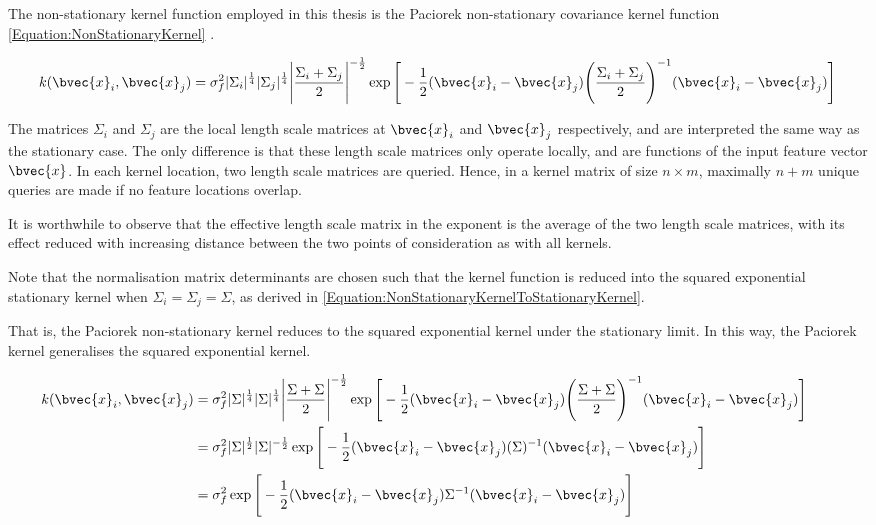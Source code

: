 				The non-stationary kernel function employed in this thesis is the Paciorek non-stationary covariance kernel function \eqref{Equation:NonStationaryKernel} \citep{AdaptiveNonStationaryKernel}.
				
				\begin{equation}
					k(\bvec{x}_{i}, \bvec{x}_{j}) = \sigma_{f}^{2} |\Sigma_{i}|^{\frac{1}{4}} |\Sigma_{j}|^{\frac{1}{4}} \Bigg|\frac{\Sigma_{i} + \Sigma_{j}}{2}\Bigg|^{-\frac{1}{2}} \exp\Bigg[ -\frac{1}{2} (\bvec{x}_{i} - \bvec{x}_{j}) \Bigg(\frac{\Sigma_{i} + \Sigma_{j}}{2}\Bigg)^{-1} (\bvec{x}_{i} - \bvec{x}_{j}) \Bigg]
				\label{Equation:NonStationaryKernel}
				\end{equation}			
				
				The matrices $\Sigma_{i}$ and $\Sigma_{j}$ are the local length scale matrices at $\bvec{x}_{i}$ and $\bvec{x}_{j}$ respectively, and are interpreted the same way as the stationary case. The only difference is that these length scale matrices only operate locally, and are functions of the input feature vector $\bvec{x}$. In each kernel location, two length scale matrices are queried. Hence, in a kernel matrix of size $n \times m$, maximally $n + m$ unique queries are made if no feature locations overlap.
				
				It is worthwhile to observe that the effective length scale matrix in the exponent is the average of the two length scale matrices, with its effect reduced with increasing distance between the two points of consideration as with all kernels.
				
				Note that the normalisation matrix determinants are chosen such that the kernel function is reduced into the squared exponential stationary kernel when $\Sigma_{i} = \Sigma_{j} = \Sigma$, as derived in \eqref{Equation:NonStationaryKernelToStationaryKernel}. 
		
				That is, the Paciorek non-stationary kernel reduces to the squared exponential kernel under the stationary limit. In this way, the Paciorek kernel generalises the squared exponential kernel.
						
				\begin{equation}
					\left.
						\begin{aligned}
							k(\bvec{x}_{i}, \bvec{x}_{j}) &= \sigma_{f}^{2} |\Sigma|^{\frac{1}{4}} |\Sigma|^{\frac{1}{4}} \Bigg|\frac{\Sigma + \Sigma}{2}\Bigg|^{-\frac{1}{2}} \exp\Bigg[ -\frac{1}{2} (\bvec{x}_{i} - \bvec{x}_{j}) \Bigg(\frac{\Sigma + \Sigma}{2}\Bigg)^{-1} (\bvec{x}_{i} - \bvec{x}_{j}) \Bigg] \\
							&= \sigma_{f}^{2} |\Sigma|^{\frac{1}{2}} |\Sigma|^{-\frac{1}{2}} \exp\Bigg[ -\frac{1}{2} (\bvec{x}_{i} - \bvec{x}_{j}) (\Sigma)^{-1} (\bvec{x}_{i} - \bvec{x}_{j}) \Bigg] \\
							&= \sigma_{f}^{2} \exp\Bigg[ -\frac{1}{2} (\bvec{x}_{i} - \bvec{x}_{j}) \Sigma^{-1} (\bvec{x}_{i} - \bvec{x}_{j}) \Bigg]
						\end{aligned}
					\qquad \right.
				\label{Equation:NonStationaryKernelToStationaryKernel}
				\end{equation}		